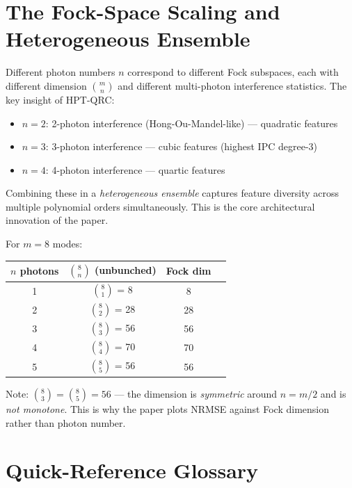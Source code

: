 \documentclass[11pt]{article}
\newcommand{\concept}[2]{%
  \begin{tcolorbox}[conceptbox, title={#1}]
  #2
  \end{tcolorbox}
}
\newcommand{\mathblock}[2]{%
  \begin{tcolorbox}[mathbox, title={Math: #1}]
  #2
  \end{tcolorbox}
}
\begin{document}
\section{The Fock-Space Scaling and Heterogeneous Ensemble}

\concept{Why Combine Multiple Photon Numbers?}{
Different photon numbers $n$ correspond to different Fock subspaces,
each with different dimension $\binom{m}{n}$ and different multi-photon
interference statistics. The key insight of HPT-QRC:

\begin{itemize}
  \item $n=2$: 2-photon interference (Hong-Ou-Mandel-like)
        --- quadratic features
  \item $n=3$: 3-photon interference
        --- cubic features (highest IPC degree-3)
  \item $n=4$: 4-photon interference
        --- quartic features
\end{itemize}

Combining these in a \emph{heterogeneous ensemble} captures feature
diversity across multiple polynomial orders simultaneously. This is
the core architectural innovation of the paper.
}

\mathblock{Fock Dimension is Not Monotone in Photon Number}{
For $m = 8$ modes:
\begin{center}
\begin{tabular}{cccc}
\toprule
$n$ photons & $\binom{8}{n}$ (unbunched) & Fock dim \\
\midrule
1 & $\binom{8}{1}$ = 8 & 8 \\
2 & $\binom{8}{2}$ = 28 & 28 \\
3 & $\binom{8}{3}$ = 56 & 56 \\
4 & $\binom{8}{4}$ = 70 & 70 \\
5 & $\binom{8}{5}$ = 56 & 56 \\
\midrule
\end{tabular}
\end{center}
Note: $\binom{8}{3} = \binom{8}{5} = 56$ --- the dimension is \emph{symmetric}
around $n = m/2$ and is \emph{not monotone}. This is why the paper plots
NRMSE against Fock dimension rather than photon number.
}

\clearpage
\section*{Quick-Reference Glossary}
\end{document}
